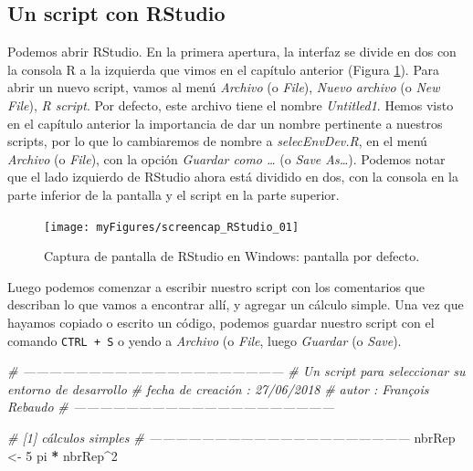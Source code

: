 \documentclass[
]{book}
\newenvironment{Shaded}{\begin{snugshade}}{\end{snugshade}}
\newcommand{\CommentTok}[1]{\textcolor[rgb]{0.56,0.35,0.01}{\textit{#1}}}
\newcommand{\DecValTok}[1]{\textcolor[rgb]{0.00,0.00,0.81}{#1}}
\newcommand{\NormalTok}[1]{#1}
\newcommand{\OperatorTok}[1]{\textcolor[rgb]{0.81,0.36,0.00}{\textbf{#1}}}
\newcommand{\StringTok}[1]{\textcolor[rgb]{0.31,0.60,0.02}{#1}}
\begin{document}
\hypertarget{un-script-con-rstudio}{%
\subsection{Un script con RStudio}\label{un-script-con-rstudio}}

Podemos abrir RStudio. En la primera apertura, la interfaz se divide en dos con la consola R a la izquierda que vimos en el capítulo anterior (Figura \ref{fig:screenCapRStudio01}). Para abrir un nuevo script, vamos al menú \emph{Archivo} (o \emph{File}), \emph{Nuevo archivo} (o \emph{New File}), \emph{R script}. Por defecto, este archivo tiene el nombre \emph{Untitled1}. Hemos visto en el capítulo anterior la importancia de dar un nombre pertinente a nuestros scripts, por lo que lo cambiaremos de nombre a \emph{selecEnvDev.R}, en el menú \emph{Archivo} (o \emph{File}), con la opción \emph{Guardar como \ldots{}} (o \emph{Save As\ldots{}}).
Podemos notar que el lado izquierdo de RStudio ahora está dividido en dos, con la consola en la parte inferior de la pantalla y el script en la parte superior.

\begin{figure}
\texttt{[image: myFigures/screencap\_RStudio\_01]} \caption{Captura de pantalla de RStudio en Windows: pantalla por defecto.\label{fig:screenCapRStudio01}}\label{fig:screenCapRStudio01}
\end{figure}

Luego podemos comenzar a escribir nuestro script con los comentarios que describan lo que vamos a encontrar allí, y agregar un cálculo simple. Una vez que hayamos copiado o escrito un código, podemos guardar nuestro script con el comando \texttt{CTRL\ +\ S} o yendo a \emph{Archivo} (o \emph{File}, luego \emph{Guardar} (o \emph{Save}).

\begin{Shaded}
\begin{Highlighting}[]
\CommentTok{# ------------------------------------------------------------}
\CommentTok{# Un script para seleccionar su entorno de desarrollo}
\CommentTok{# fecha de creación : 27/06/2018}
\CommentTok{# autor : François Rebaudo}
\CommentTok{# ------------------------------------------------------------}

\CommentTok{# [1] cálculos simples}
\CommentTok{# ------------------------------------------------------------}
\NormalTok{nbrRep <-}\StringTok{ }\DecValTok{5}
\NormalTok{pi }\OperatorTok{*}\StringTok{ }\NormalTok{nbrRep}\OperatorTok{^}\DecValTok{2}
\end{Highlighting}
\end{Shaded}
\end{document}
